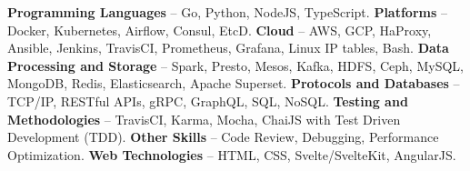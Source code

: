 \textbf{Programming Languages} -- Go, Python, NodeJS, TypeScript. 
\textbf{Platforms} -- Docker, Kubernetes, Airflow, Consul, EtcD.
\textbf{Cloud} -- AWS, GCP, HaProxy, Ansible, Jenkins, TravisCI, Prometheus, Grafana, Linux IP tables, Bash.
\textbf{Data Processing and Storage} --
Spark, Presto, Mesos, Kafka, HDFS, Ceph, MySQL, MongoDB, Redis, Elasticsearch, Apache Superset.
\textbf{Protocols and Databases} -- TCP/IP, RESTful APIs, gRPC, GraphQL, SQL, NoSQL.
\textbf{Testing and Methodologies} -- TravisCI, Karma, Mocha, ChaiJS with Test Driven Development (TDD).
\textbf{Other Skills} -- Code Review, Debugging, Performance Optimization.
\textbf{Web Technologies} --
HTML, CSS, Svelte/SvelteKit, AngularJS.
